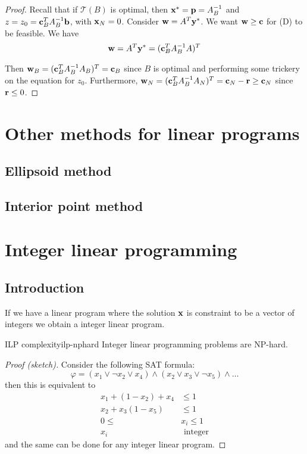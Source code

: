 \documentclass[12pt]{extarticle}
\renewcommand{\vec}[1]{\bvec{#1}}
\begin{document}
\begin{proof}
	Recall that if $\mathcal T(B)$ is optimal, then $\vec x^* = \vec p = A_B^{-1}$ and
	$z = z_0 = \vec c^T_B A_B^{-1} \vec b$, with $\vec x_N = 0$.
	Consider $\vec w = A^T \vec y^*$. We want $\vec w \geq \vec c$ for (D) to be feasible.
	We have
	\begin{equation}
		\vec w = A^T \vec y^* = (\vec c^T_B A_B^{-1} A)^T
	\end{equation}

	Then $\vec w_B = (\vec c_B^T A_B^{-1}A_B)^T = \vec c_B$ since $B$ is optimal and performing some
	trickery on the equation for $z_0$.
	Furthermore, $\vec w_N  = (\vec c_B^T A_B^{-1}A_N)^T = \vec c_N - \vec r \geq \vec c_N$ since
	$\vec r \leq 0$.
\end{proof}

\section{Other methods for linear programs}
\subsection{Ellipsoid method}

\subsection{Interior point method}

\section{Integer linear programming}

\subsection{Introduction}

If we have a linear program where the solution $\vec x$ is constraint to be a vector of integers
we obtain a integer linear program.

\begin{theorem}{ILP complexity}{ilp-nphard}
	Integer linear programming problems are NP-hard.
\end{theorem}
\begin{proof}[Proof (sketch)]
	Consider the following SAT formula:
	\begin{equation}
		\varphi = (x_1 \lor \lnot x_2 \lor x_4) \land (x_2 \lor x_3 \lor \lnot x_5) \land \dots
	\end{equation}
	then
	this is equivalent to
	\begin{align}
		x_1 + (1-x_2) + x_4    & \leq 1          \\
		x_2 + x_3 (1 - x_5)    & \leq 1          \\
		0 \leq              {} & x_i \leq 1      \\
		x_i                    & \text{ integer}
	\end{align}
	and the same can be done for any integer linear program.
\end{proof}
\end{document}
